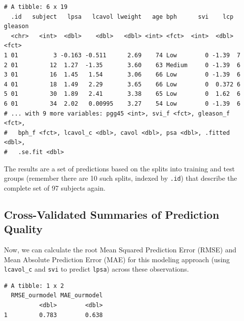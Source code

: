 \documentclass[]{book}
\newenvironment{Shaded}{\begin{snugshade}}{\end{snugshade}}
\newcommand{\KeywordTok}[1]{\textcolor[rgb]{0.13,0.29,0.53}{\textbf{#1}}}
\newcommand{\DataTypeTok}[1]{\textcolor[rgb]{0.13,0.29,0.53}{#1}}
\newcommand{\DecValTok}[1]{\textcolor[rgb]{0.00,0.00,0.81}{#1}}
\newcommand{\StringTok}[1]{\textcolor[rgb]{0.31,0.60,0.02}{#1}}
\newcommand{\OperatorTok}[1]{\textcolor[rgb]{0.81,0.36,0.00}{\textbf{#1}}}
\newcommand{\NormalTok}[1]{#1}
\theoremstyle{definition}
\theoremstyle{definition}
\theoremstyle{definition}
\theoremstyle{remark}
\begin{document}
\begin{verbatim}
# A tibble: 6 x 19
  .id   subject   lpsa   lcavol lweight   age bph      svi    lcp gleason
  <chr>   <int>  <dbl>    <dbl>   <dbl> <int> <fct>  <int>  <dbl> <fct>  
1 01          3 -0.163 -0.511      2.69    74 Low        0 -1.39  7      
2 01         12  1.27  -1.35       3.60    63 Medium     0 -1.39  6      
3 01         16  1.45   1.54       3.06    66 Low        0 -1.39  6      
4 01         18  1.49   2.29       3.65    66 Low        0  0.372 6      
5 01         30  1.89   2.41       3.38    65 Low        0  1.62  6      
6 01         34  2.02   0.00995    3.27    54 Low        0 -1.39  6      
# ... with 9 more variables: pgg45 <int>, svi_f <fct>, gleason_f <fct>,
#   bph_f <fct>, lcavol_c <dbl>, cavol <dbl>, psa <dbl>, .fitted <dbl>,
#   .se.fit <dbl>
\end{verbatim}

The results are a set of predictions based on the splits into training
and test groups (remember there are 10 such splits, indexed by
\texttt{.id}) that describe the complete set of 97 subjects again.

\subsection{Cross-Validated Summaries of Prediction
Quality}\label{cross-validated-summaries-of-prediction-quality}

Now, we can calculate the root Mean Squared Prediction Error (RMSE) and
Mean Absolute Prediction Error (MAE) for this modeling approach (using
\texttt{lcavol\_c} and \texttt{svi} to predict \texttt{lpsa}) across
these observations.

\begin{Shaded}
\end{Shaded}

\begin{verbatim}
# A tibble: 1 x 2
  RMSE_ourmodel MAE_ourmodel
          <dbl>        <dbl>
1         0.783        0.638
\end{verbatim}
\end{document}
